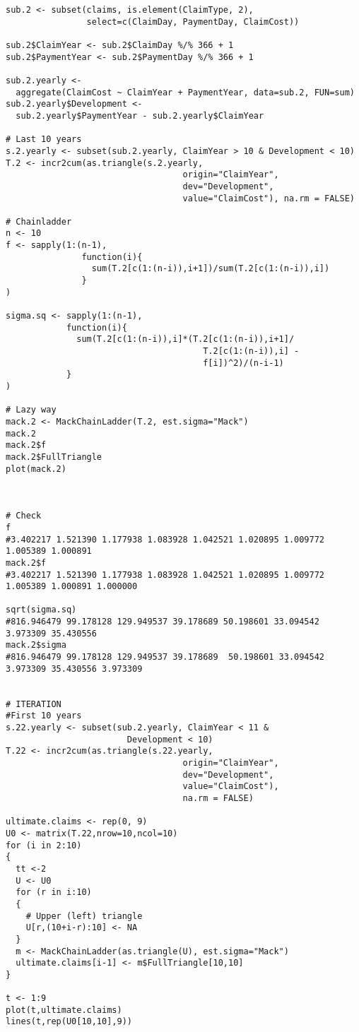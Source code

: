 \documentclass[a4paper]{article}
\begin{document}
\begin{verbatim}
sub.2 <- subset(claims, is.element(ClaimType, 2),
                select=c(ClaimDay, PaymentDay, ClaimCost))

sub.2$ClaimYear <- sub.2$ClaimDay %/% 366 + 1
sub.2$PaymentYear <- sub.2$PaymentDay %/% 366 + 1

sub.2.yearly <- 
  aggregate(ClaimCost ~ ClaimYear + PaymentYear, data=sub.2, FUN=sum)
sub.2.yearly$Development <-
  sub.2.yearly$PaymentYear - sub.2.yearly$ClaimYear

# Last 10 years
s.2.yearly <- subset(sub.2.yearly, ClaimYear > 10 & Development < 10)
T.2 <- incr2cum(as.triangle(s.2.yearly,
                                   origin="ClaimYear",
                                   dev="Development",
                                   value="ClaimCost"), na.rm = FALSE)

# Chainladder
n <- 10
f <- sapply(1:(n-1),
               function(i){
                 sum(T.2[c(1:(n-i)),i+1])/sum(T.2[c(1:(n-i)),i])
               }
)

sigma.sq <- sapply(1:(n-1),
            function(i){
              sum(T.2[c(1:(n-i)),i]*(T.2[c(1:(n-i)),i+1]/
                                       T.2[c(1:(n-i)),i] -
                                       f[i])^2)/(n-i-1)
            }
)

# Lazy way
mack.2 <- MackChainLadder(T.2, est.sigma="Mack")
mack.2
mack.2$f
mack.2$FullTriangle
plot(mack.2)



# Check
f
#3.402217 1.521390 1.177938 1.083928 1.042521 1.020895 1.009772 1.005389 1.000891
mack.2$f
#3.402217 1.521390 1.177938 1.083928 1.042521 1.020895 1.009772 1.005389 1.000891 1.000000

sqrt(sigma.sq)
#816.946479 99.178128 129.949537 39.178689 50.198601 33.094542 3.973309 35.430556
mack.2$sigma
#816.946479 99.178128 129.949537 39.178689  50.198601 33.094542 3.973309 35.430556 3.973309


# ITERATION
#First 10 years
s.22.yearly <- subset(sub.2.yearly, ClaimYear < 11 &
                        Development < 10)
T.22 <- incr2cum(as.triangle(s.22.yearly,
                                   origin="ClaimYear",
                                   dev="Development",
                                   value="ClaimCost"),
                                   na.rm = FALSE)

ultimate.claims <- rep(0, 9)
U0 <- matrix(T.22,nrow=10,ncol=10)
for (i in 2:10)
{
  tt <-2
  U <- U0
  for (r in i:10)
  {
    # Upper (left) triangle
    U[r,(10+i-r):10] <- NA
  }
  m <- MackChainLadder(as.triangle(U), est.sigma="Mack")
  ultimate.claims[i-1] <- m$FullTriangle[10,10]
}

t <- 1:9
plot(t,ultimate.claims)
lines(t,rep(U0[10,10],9))

\end{verbatim}
\end{document}

